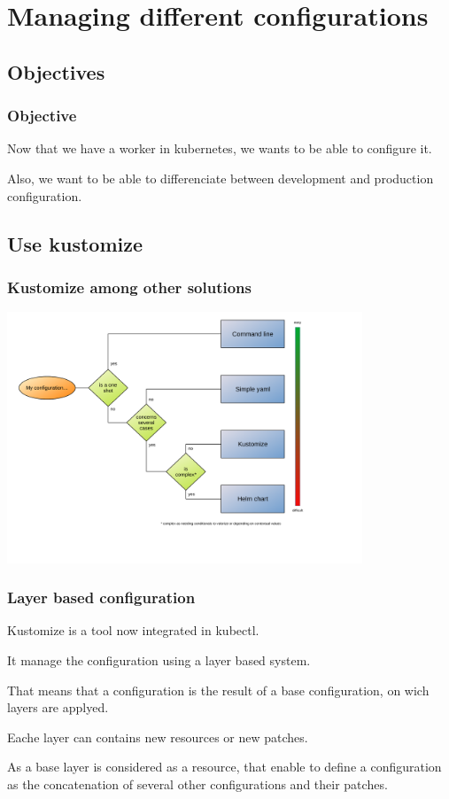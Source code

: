 \section{Managing different configurations}

\subsection{Objectives}

	\begin{frame}
		\frametitle{Objective}
		
		Now that we have a worker in kubernetes, we wants to be able to configure it.
		
		Also, we want to be able to differenciate between development and production configuration.
		
	\end{frame}
	
\subsection{Use kustomize}	
	
	\begin{frame}
		\frametitle{Kustomize among other solutions}
		
		\begin{center}
		\includegraphics[height=7.5cm]{../../../resources/color/choiceConfigKind.pdf}
		\end{center}
	\end{frame}
	
	\begin{frame}
		\frametitle{Layer based configuration}
		
		Kustomize is a tool now integrated in kubectl.
		
		\bigskip
		It manage the configuration using a layer based system.
		
		That means that a configuration is the result of a base configuration, on wich layers are applyed.
		
		Eache layer can contains new resources or new patches.
		
		\bigskip
		As a base layer is considered as a resource, that enable to define a configuration as the concatenation of several other configurations and their patches.
	\end{frame}
	

